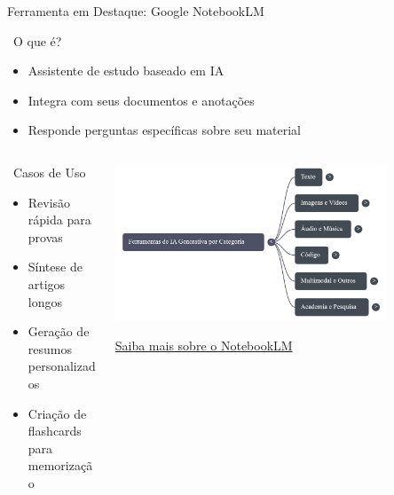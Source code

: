 \documentclass[aspectratio=169,12pt]{beamer}
\begin{document}
\begin{frame}{Ferramenta em Destaque: Google NotebookLM}
    \begin{block}{\faBook\, O que é?}
        \begin{itemize}
            \item Assistente de estudo baseado em IA
            \item Integra com seus documentos e anotações
            \item Responde perguntas específicas sobre seu material
        \end{itemize}
    \end{block}
    
    \begin{columns}
        \begin{column}{0.6\textwidth}
            \begin{exampleblock}{\faLightbulb\, Casos de Uso}
                \begin{itemize}
                    \item Revisão rápida para provas
                    \item Síntese de artigos longos
                    \item Geração de resumos personalizados
                    \item Criação de flashcards para memorização
                \end{itemize}
            \end{exampleblock}
        \end{column}
        \begin{column}{0.4\textwidth}
            \begin{center}
                \includegraphics[width=0.8\textwidth]{NotebookLMMindMap.png}
                
                \vspace{0.5cm}
                
                \href{https://taaqui.unesp.br/tools-ia}{\textcolor{accent}{Saiba mais sobre o NotebookLM}}
            \end{center}
        \end{column}
    \end{columns}
\end{frame}
\end{document}

